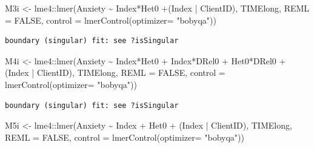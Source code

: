 \documentclass[
  english,
]{book}
\newenvironment{Shaded}{\begin{snugshade}}{\end{snugshade}}
\newcommand{\AttributeTok}[1]{\textcolor[rgb]{0.77,0.63,0.00}{#1}}
\newcommand{\ConstantTok}[1]{\textcolor[rgb]{0.00,0.00,0.00}{#1}}
\newcommand{\FunctionTok}[1]{\textcolor[rgb]{0.00,0.00,0.00}{#1}}
\newcommand{\NormalTok}[1]{#1}
\newcommand{\OtherTok}[1]{\textcolor[rgb]{0.56,0.35,0.01}{#1}}
\newcommand{\SpecialCharTok}[1]{\textcolor[rgb]{0.00,0.00,0.00}{#1}}
\newcommand{\StringTok}[1]{\textcolor[rgb]{0.31,0.60,0.02}{#1}}
\begin{document}
\begin{Shaded}
\begin{Highlighting}[]
\NormalTok{M3i }\OtherTok{\textless{}{-}}\NormalTok{ lme4}\SpecialCharTok{::}\FunctionTok{lmer}\NormalTok{(Anxiety }\SpecialCharTok{\textasciitilde{}}\NormalTok{ Index}\SpecialCharTok{*}\NormalTok{Het0 }\SpecialCharTok{+}\NormalTok{(Index }\SpecialCharTok{|}\NormalTok{ ClientID), TIMElong, }\AttributeTok{REML =} \ConstantTok{FALSE}\NormalTok{, }\AttributeTok{control =} \FunctionTok{lmerControl}\NormalTok{(}\AttributeTok{optimizer=} \StringTok{"bobyqa"}\NormalTok{))}
\end{Highlighting}
\end{Shaded}

\begin{verbatim}
boundary (singular) fit: see ?isSingular
\end{verbatim}

\begin{Shaded}
\begin{Highlighting}[]
\NormalTok{M4i }\OtherTok{\textless{}{-}}\NormalTok{ lme4}\SpecialCharTok{::}\FunctionTok{lmer}\NormalTok{(Anxiety }\SpecialCharTok{\textasciitilde{}}\NormalTok{ Index}\SpecialCharTok{*}\NormalTok{Het0 }\SpecialCharTok{+}\NormalTok{ Index}\SpecialCharTok{*}\NormalTok{DRel0 }\SpecialCharTok{+}\NormalTok{ Het0}\SpecialCharTok{*}\NormalTok{DRel0 }\SpecialCharTok{+}\NormalTok{ (Index }\SpecialCharTok{|}\NormalTok{ ClientID), TIMElong, }\AttributeTok{REML =} \ConstantTok{FALSE}\NormalTok{, }\AttributeTok{control =} \FunctionTok{lmerControl}\NormalTok{(}\AttributeTok{optimizer=} \StringTok{"bobyqa"}\NormalTok{))}
\end{Highlighting}
\end{Shaded}

\begin{verbatim}
boundary (singular) fit: see ?isSingular
\end{verbatim}

\begin{Shaded}
\begin{Highlighting}[]
\NormalTok{M5i }\OtherTok{\textless{}{-}}\NormalTok{ lme4}\SpecialCharTok{::}\FunctionTok{lmer}\NormalTok{(Anxiety }\SpecialCharTok{\textasciitilde{}}\NormalTok{ Index }\SpecialCharTok{+}\NormalTok{ Het0 }\SpecialCharTok{+}\NormalTok{ (Index }\SpecialCharTok{|}\NormalTok{ ClientID), TIMElong, }\AttributeTok{REML =} \ConstantTok{FALSE}\NormalTok{, }\AttributeTok{control =} \FunctionTok{lmerControl}\NormalTok{(}\AttributeTok{optimizer=} \StringTok{"bobyqa"}\NormalTok{))}
\end{Highlighting}
\end{Shaded}
\end{document}
